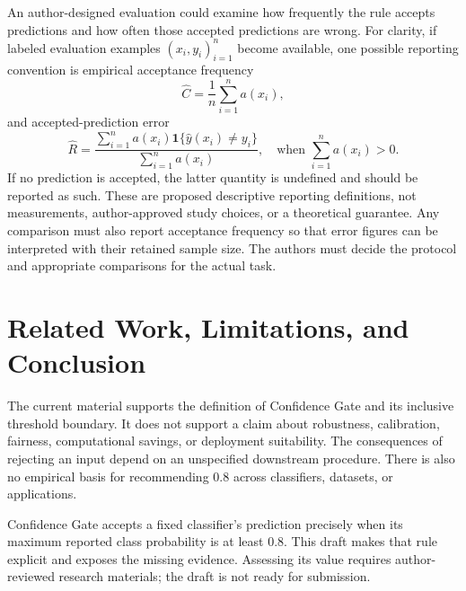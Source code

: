 An author-designed evaluation could examine how frequently the rule accepts
predictions and how often those accepted predictions are wrong. For clarity,
if labeled evaluation examples $(x_i,y_i)_{i=1}^n$ become available, one possible
reporting convention is empirical acceptance frequency
\begin{equation}
 \widehat C=\frac{1}{n}\sum_{i=1}^n a(x_i),
\end{equation}
and accepted-prediction error
\begin{equation}
 \widehat R=\frac{\sum_{i=1}^n a(x_i)\mathbf{1}\{\widehat y(x_i)\neq y_i\}}
 {\sum_{i=1}^n a(x_i)},
 \quad\text{when }\sum_{i=1}^n a(x_i)>0.
\end{equation}
If no prediction is accepted, the latter quantity is undefined and should be
reported as such. These are proposed descriptive reporting definitions, not
measurements, author-approved study choices, or a theoretical guarantee.
Any comparison must also report acceptance frequency so that error figures can
be interpreted with their retained sample size. The authors must decide the
protocol and appropriate comparisons for the actual task.


\section{Related Work, Limitations, and Conclusion}
\label{sec:limitations}

The current material supports the definition of Confidence Gate and its
inclusive threshold boundary. It does not support a claim about robustness,
calibration, fairness, computational savings, or deployment suitability.
The consequences of rejecting an input depend on an unspecified downstream
procedure. There is also no empirical basis for recommending $0.8$ across
classifiers, datasets, or applications.

Confidence Gate accepts a fixed classifier's prediction precisely when its
maximum reported class probability is at least $0.8$. This draft makes that
rule explicit and exposes the missing evidence. Assessing its value requires
author-reviewed research materials; the draft is not ready for submission.
\label{pw:main-end}

